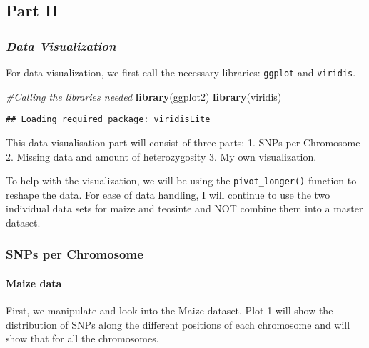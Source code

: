 \documentclass[
]{article}
\newenvironment{Shaded}{\begin{snugshade}}{\end{snugshade}}
\newcommand{\CommentTok}[1]{\textcolor[rgb]{0.56,0.35,0.01}{\textit{#1}}}
\newcommand{\FunctionTok}[1]{\textcolor[rgb]{0.13,0.29,0.53}{\textbf{#1}}}
\newcommand{\NormalTok}[1]{#1}
\begin{document}
\subsection{Part II}\label{part-ii}

\subsubsection{\texorpdfstring{\emph{Data
Visualization}}{Data Visualization}}\label{data-visualization}

For data visualization, we first call the necessary libraries:
\texttt{ggplot} and \texttt{viridis}.

\begin{Shaded}
\begin{Highlighting}[]
\CommentTok{\#Calling the libraries needed}
\FunctionTok{library}\NormalTok{(ggplot2)}
\FunctionTok{library}\NormalTok{(viridis)}
\end{Highlighting}
\end{Shaded}

\begin{verbatim}
## Loading required package: viridisLite
\end{verbatim}

This data visualisation part will consist of three parts: 1. SNPs per
Chromosome 2. Missing data and amount of heterozygosity 3. My own
visualization.

To help with the visualization, we will be using the
\texttt{pivot\_longer()} function to reshape the data. For ease of data
handling, I will continue to use the two individual data sets for maize
and teosinte and NOT combine them into a master dataset.

\subsubsection{SNPs per Chromosome}\label{snps-per-chromosome}

\paragraph{Maize data}\label{maize-data-1}

First, we manipulate and look into the Maize dataset. Plot 1 will show
the distribution of SNPs along the different positions of each
chromosome and will show that for all the chromosomes.
\end{document}
